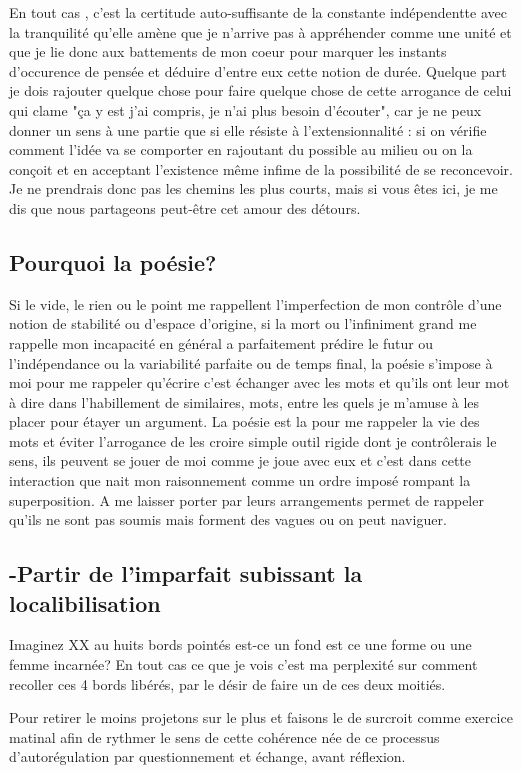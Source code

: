 \documentclass{article}
\begin{document}
En tout cas , c'est la certitude auto-suffisante de la constante indépendentte avec la tranquilité qu'elle amène que je n'arrive pas à appréhender comme une unité et que je lie donc aux battements de mon coeur pour marquer  les instants d'occurence de pensée et déduire d'entre eux cette notion de durée.
Quelque part je dois rajouter quelque chose pour faire quelque chose de cette arrogance de celui qui clame "ça y est j'ai compris, je n'ai plus besoin d'écouter", 
car je ne peux donner un sens à une partie que si elle résiste à l'extensionnalité : si on vérifie comment l'idée va se comporter en rajoutant du possible au milieu ou on la conçoit et en acceptant l'existence même infime de la possibilité de se reconcevoir. Je ne prendrais donc pas les chemins les plus courts, mais si vous êtes ici, je me dis que nous partageons peut-être cet amour des détours.

\subsection{Pourquoi la poésie?}
Si le vide, le rien ou le point me rappellent l'imperfection de mon contrôle d'une notion de stabilité ou d'espace d'origine, si la mort ou l'infiniment grand me rappelle mon incapacité en général a parfaitement prédire le futur ou l'indépendance ou la variabilité parfaite ou de temps final, la poésie s'impose à moi pour me rappeler qu'écrire c'est échanger avec les mots et qu'ils ont leur mot à dire dans l'habillement de similaires, mots, entre les quels je m'amuse à les placer pour étayer un argument. La poésie est la pour me rappeler la vie des mots et éviter l'arrogance de les croire  simple outil rigide dont je contrôlerais le sens, ils peuvent se jouer de moi comme je joue avec eux et c'est dans cette interaction que nait mon raisonnement comme un ordre imposé rompant la superposition. A me laisser porter par leurs arrangements permet de rappeler qu'ils ne sont pas soumis mais forment des vagues ou on peut naviguer.  

\subsection{ -Partir de l'imparfait subissant la localibilisation}
 Imaginez  XX au huits bords pointés est-ce un fond est ce une forme ou une femme incarnée?
 En tout cas ce que je vois c'est ma perplexité sur comment recoller ces 4 bords libérés, par le désir de faire un de ces deux moitiés.
 
Pour retirer le moins projetons sur le plus et faisons le de surcroit comme exercice matinal afin de rythmer le sens de cette cohérence née de ce processus 
d'autorégulation par questionnement et échange, avant  réflexion.
\end{document}
